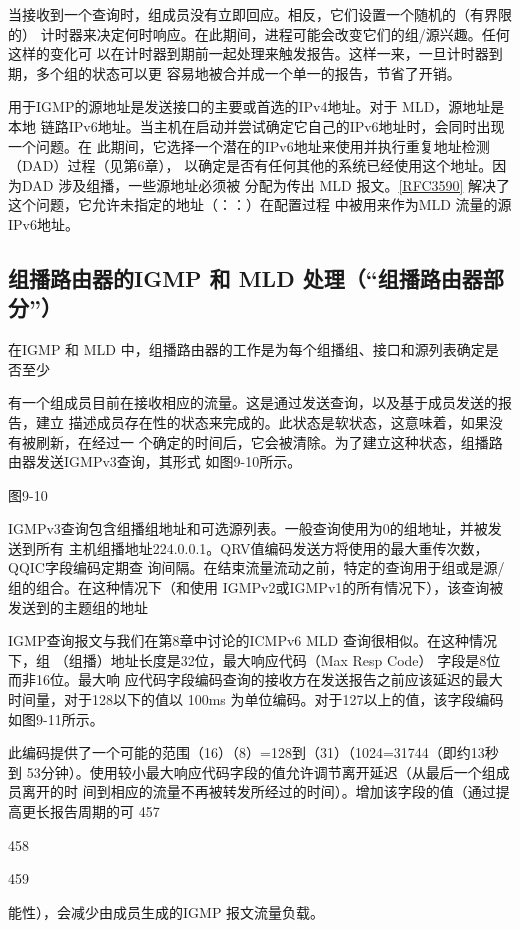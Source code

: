 当接收到一个查询时，组成员没有立即回应。相反，它们设置一个随机的（有界限的）
计时器来决定何时响应。在此期间，进程可能会改变它们的组/源兴趣。任何这样的变化可
以在计时器到期前一起处理来触发报告。这样一来，一旦计时器到期，多个组的状态可以更
容易地被合并成一个单一的报告，节省了开销。

用于IGMP的源地址是发送接口的主要或首选的IPv4地址。对于 MLD，源地址是本地
链路IPv6地址。当主机在启动并尝试确定它自己的IPv6地址时，会同时出现一个问题。在
此期间，它选择一个潜在的IPv6地址来使用并执行重复地址检测（DAD）过程（见第6章），
以确定是否有任何其他的系统已经使用这个地址。因为DAD 涉及组播，一些源地址必须被
分配为传出 MLD 报文。\href{https://www.rfc-editor.org/rfc/rfc3590}{[RFC3590]} 解决了这个问题，它允许未指定的地址（：：）在配置过程
中被用来作为MLD 流量的源IPv6地址。

\subsection{组播路由器的IGMP 和 MLD 处理（“组播路由器部分”）}
在IGMP 和 MLD 中，组播路由器的工作是为每个组播组、接口和源列表确定是否至少

有一个组成员目前在接收相应的流量。这是通过发送查询，以及基于成员发送的报告，建立
描述成员存在性的状态来完成的。此状态是软状态，这意味着，如果没有被刷新，在经过一
个确定的时间后，它会被清除。为了建立这种状态，组播路由器发送IGMPv3查询，其形式
如图9-10所示。

图9-10

IGMPv3查询包含组播组地址和可选源列表。一般查询使用为0的组地址，并被发送到所有
主机组播地址224.0.0.1。QRV值编码发送方将使用的最大重传次数，QQIC字段编码定期查
询间隔。在结束流量流动之前，特定的查询用于组或是源/组的组合。在这种情况下（和使用
IGMPv2或IGMPv1的所有情况下），该查询被发送到的主题组的地址

IGMP查询报文与我们在第8章中讨论的ICMPv6 MLD 查询很相似。在这种情况下，组
（组播）地址长度是32位，最大响应代码（Max Resp Code） 字段是8位而非16位。最大响
应代码字段编码查询的接收方在发送报告之前应该延迟的最大时间量，对于128以下的值以
100ms 为单位编码。对于127以上的值，该字段编码如图9-11所示。

此编码提供了一个可能的范围（16）（8）=128到（31）（1024=31744（即约13秒到
53分钟）。使用较小最大响应代码字段的值允许调节离开延迟（从最后一个组成员离开的时
间到相应的流量不再被转发所经过的时间）。增加该字段的值（通过提高更长报告周期的可
457

458

459

能性），会减少由成员生成的IGMP 报文流量负载。

